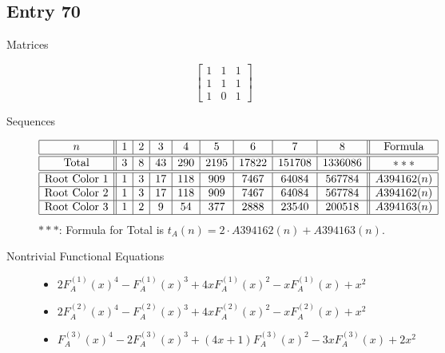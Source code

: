 \documentclass[12pt]{amsart}
\newcommand{\gff}[2]{F_{#2}^{(#1)}(x)}
\newcommand{\gfa}[1]{\gff{#1}{A}}
\begin{document}
\subsection*{Entry 70}
\begin{description}
    \item[Matrices]
    
    \[\begin{bmatrix}
1 & 1 & 1 \\
1 & 1 & 1 \\
1 & 0 & 1
\end{bmatrix}\]
    \item[Sequences]\hspace*{\fill}\vspace{-0.5cm}
    \begin{center}
        \[
        \begin{array}{|c||c|c|c|c|c|c|c|c||c|}\hline
           n  & 1 & 2 & 3 & 4 & 5 & 6 & 7 & 8  & \text{Formula}\\\hline\hline
           \text{Total}  & 3 & 8 & 43 & 290 & 2195 & 17822 & 151708 & 1336086 & *** \\\hline\hline
           \text{Root Color }1 & 1 & 3 & 17 & 118 & 909 & 7467 & 64084 & 567784 & A394162(n) \\\hline
           \text{Root Color }2 & 1 & 3 & 17 & 118 & 909 & 7467 & 64084 & 567784 & A394162(n) \\\hline
           \text{Root Color }3 & 1 & 2 & 9 & 54 & 377 & 2888 & 23540 & 200518 & A394163(n) \\\hline
        \end{array}
        \]
        $***$: Formula for Total is $t_A(n)=2\cdot A394162(n)+A394163(n)$.
    \end{center}
    
    \item[Nontrivial Functional Equations]\hspace*{\fill}

    \begin{itemize}
\item $2\gfa{1}^4-\gfa{1}^3+4x\gfa{1}^2-x\gfa{1}+x^2$


\item $2\gfa{2}^4-\gfa{2}^3+4x\gfa{2}^2-x\gfa{2}+x^2$

\item $\gfa{3}^4-2\gfa{3}^3+(4x + 1)\gfa{3}^2-3x\gfa{3}+2x^2$


\end{itemize}
    
\end{description}
\end{document}
